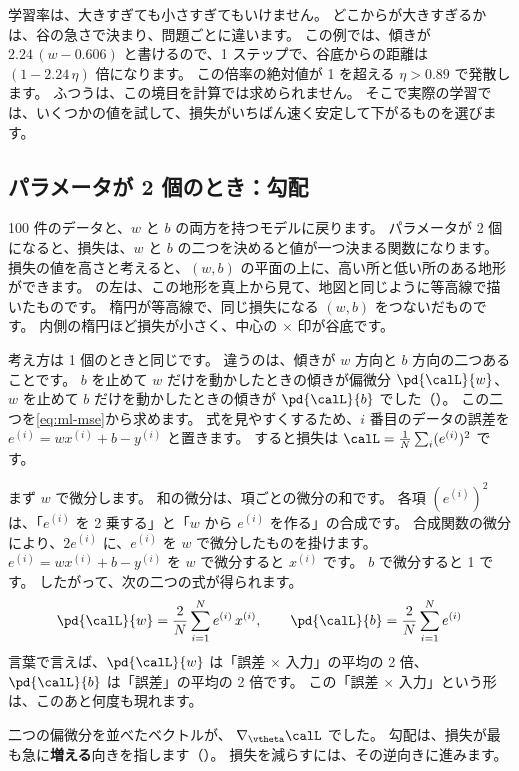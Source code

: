 学習率は、大きすぎても小さすぎてもいけません。
どこからが大きすぎるかは、谷の急さで決まり、問題ごとに違います。
この例では、傾きが $2.24\,(w - 0.606)$ と書けるので、1 ステップで、谷底からの距離は $(1 - 2.24\,\eta)$ 倍になります。
この倍率の絶対値が 1 を超える $\eta > 0.89$ で発散します。
ふつうは、この境目を計算では求められません。
そこで実際の学習では、いくつかの値を試して、損失がいちばん速く安定して下がるものを選びます。

\subsection*{パラメータが 2 個のとき：勾配}

100 件のデータと、$w$ と $b$ の両方を持つモデルに戻ります。
パラメータが 2 個になると、損失は、$w$ と $b$ の二つを決めると値が一つ決まる関数になります。
損失の値を高さと考えると、$(w, b)$ の平面の上に、高い所と低い所のある地形ができます。
の左は、この地形を真上から見て、地図と同じように等高線で描いたものです。
楕円が等高線で、同じ損失になる $(w, b)$ をつないだものです。
内側の楕円ほど損失が小さく、中心の $\times$ 印が谷底です。

考え方は 1 個のときと同じです。
違うのは、傾きが $w$ 方向と $b$ 方向の二つあることです。
$b$ を止めて $w$ だけを動かしたときの傾きが偏微分 $\pd{\calL}{w}$、
$w$ を止めて $b$ だけを動かしたときの傾きが $\pd{\calL}{b}$ でした（）。
この二つを\eqref{eq:ml-mse}から求めます。
式を見やすくするため、$i$ 番目のデータの誤差を $e^{(i)} = wx^{(i)} + b - y^{(i)}$ と置きます。
すると損失は $\calL = \frac{1}{N}\sum_i (e^{(i)})^2$ です。

まず $w$ で微分します。
和の微分は、項ごとの微分の和です。
各項 $(e^{(i)})^2$ は、「$e^{(i)}$ を 2 乗する」と「$w$ から $e^{(i)}$ を作る」の合成です。
合成関数の微分により、$2e^{(i)}$ に、$e^{(i)}$ を $w$ で微分したものを掛けます。
$e^{(i)} = wx^{(i)} + b - y^{(i)}$ を $w$ で微分すると $x^{(i)}$ です。
$b$ で微分すると 1 です。
したがって、次の二つの式が得られます。
\begin{equation}
\pd{\calL}{w} = \frac{2}{N}\sum_{i=1}^{N} e^{(i)}\,x^{(i)},
\qquad
\pd{\calL}{b} = \frac{2}{N}\sum_{i=1}^{N} e^{(i)}
\label{eq:ml-linreg-grad}
\end{equation}
言葉で言えば、$\pd{\calL}{w}$ は「誤差 $\times$ 入力」の平均の 2 倍、$\pd{\calL}{b}$ は「誤差」の平均の 2 倍です。
この「誤差 $\times$ 入力」という形は、このあと何度も現れます。

二つの偏微分を並べたベクトルが、 $\nabla_{\vtheta}\calL$ でした。
勾配は、損失が最も急に\textbf{増える}向きを指します（）。
損失を減らすには、その逆向きに進みます。

